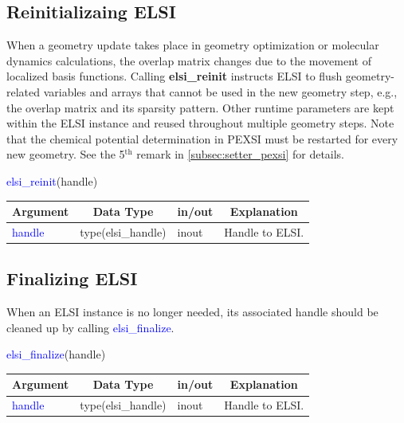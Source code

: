 \documentclass{report}
\newcommand{\tcb}[1]{\textcolor{blue}{#1}}
\begin{document}
\subsection{Reinitializaing ELSI}
\label{subsec:setup_reinit}
When a geometry update takes place in geometry optimization or molecular dynamics calculations, the overlap matrix changes due to the movement of localized basis functions. Calling \textbf{elsi\_reinit} instructs ELSI to flush geometry-related variables and arrays that cannot be used in the new geometry step, e.g., the overlap matrix and its sparsity pattern. Other runtime parameters are kept within the ELSI instance and reused throughout multiple geometry steps. Note that the chemical potential determination in PEXSI must be restarted for every new geometry. See the 5$^\text{th}$ remark in \ref{subsec:setter_pexsi} for details.
\begin{labeling}{\hspace{6cm}}
\item [\hspace{0.3cm} \tcb{elsi\_reinit}(handle)]
\end{labeling}

\begin{tabular}[]{|p{30mm}|p{30mm}|p{15mm}|p{90mm}|}
\hline
\multicolumn{1}{|c|}{\textbf{Argument}} & \multicolumn{1}{c|}{\textbf{Data Type}} & \multicolumn{1}{c|}{\textbf{in/out}} & \multicolumn{1}{c|}{\textbf{Explanation}}\\
\hline
\tcb{handle} & type(elsi\_handle) & inout & Handle to ELSI.\\
\hline
\end{tabular}

\subsection{Finalizing ELSI}
\label{subsec:setup_final}
When an ELSI instance is no longer needed, its associated handle should be cleaned up by calling \tcb{elsi\_finalize}.
\begin{labeling}{\hspace{6cm}}
\item [\hspace{0.3cm} \tcb{elsi\_finalize}(handle)]
\end{labeling}

\begin{tabular}[]{|p{30mm}|p{30mm}|p{15mm}|p{90mm}|}
\hline
\multicolumn{1}{|c|}{\textbf{Argument}} & \multicolumn{1}{c|}{\textbf{Data Type}} & \multicolumn{1}{c|}{\textbf{in/out}} & \multicolumn{1}{c|}{\textbf{Explanation}}\\
\hline
\tcb{handle} & type(elsi\_handle) & inout & Handle to ELSI.\\
\hline
\end{tabular}
\end{document}
